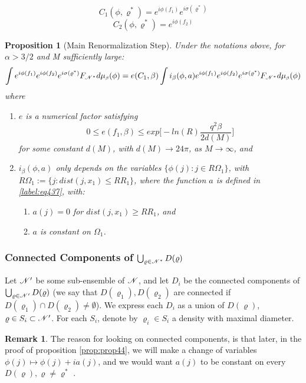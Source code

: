 \documentclass[11pt,reqno]{article}
\newtheorem{prop}[thm]{Proposition}
\theoremstyle{definition}
\newtheorem*{remark}{Remark}
\numberwithin{equation}{section}
\begin{document}
$$
C_1(\phi, \varrho^*) = e^{i\phi(f_1)} e^{i\sigma(\varrho^*)}
$$ 
$$
C_2(\phi, \varrho^*) = e^{i\phi(f_2)}
$$ 

\begin{prop}[Main Renormalization Step] \label{prop:prop44}
Under the notations above, for $\alpha > 3/2$ and M sufficiently large:
\begin{equation} \label{label:eq44}
\int e^{i\phi(f_1)} e^{i\phi(f_2)} e^{i\sigma(\varrho^*)} F_{\mathscr{N}^*}d\mu_{\text{\tiny$\beta$}}(\phi) = 
e(C_1, \beta) \int i_\beta(\phi,a) e^{i\phi(f_1)} e^{i\phi(f_2)} e^{i\sigma(\varrho^*)} F_{\mathscr{N}^*}d\mu_{\text{\tiny$\beta$}}(\phi)
\end{equation}
where
\begin{enumerate}[label={\alph*)}]
\item $e$ is a numerical factor satisfying
$$
0 \leq e(f_1, \beta) \leq exp\Big[ -ln(R)\frac{q^2\beta}{2d(M)} \Big]
$$
for some constant $d(M)$, with $d(M) \rightarrow 24\pi$, as $M\rightarrow \infty$, and
\item $i_\beta(\phi,a)$ only depends on the variables $\{ \phi(j):j \in R\Omega_1 \}$, with $R\Omega_1 := \{ j: dist(j,x_1) \leq RR_1 \}$, where the function $a$ is defined in \eqref{label:eq437}, with:
\begin{enumerate}
\item $a(j)=0$ for $dist(j,x_1) \geq RR_1$, and
\item $a$ is constant on $\Omega_1$.
\end{enumerate}

\end{enumerate}
\end{prop}
\subsubsection{Connected Components of $\bigcup_{\varrho \in \mathscr{N}^*}D(\varrho)$}
Let $\mathscr{N}^\prime$ be some sub-ensemble of $\mathscr{N}$, and let $D_i$ be the connected components of $\bigcup_{\varrho \in \mathscr{N}^\prime}D(\varrho)$ (we say that $D(\varrho_1), D(\varrho_2)$ are connected if $D(\varrho_1)\cap D(\varrho_2)\neq\emptyset$). We express each $D_i$ as a union of $D(\varrho)$, $\varrho \in S_i \subset \mathscr{N}^\prime$. For each $S_i$, denote by $\varrho_i \in S_i$ a density with maximal diameter.
\begin{remark}
The reason for looking on connected components, is that later, in the proof of proposition \eqref{prop:prop44}, we will make a change of variables $\phi(j) \longmapsto \phi(j) + ia(j)$, and we would want $a(j)$ to be constant on every $D(\varrho), \varrho \neq \varrho^*$ .
\end{remark}
\end{document}
